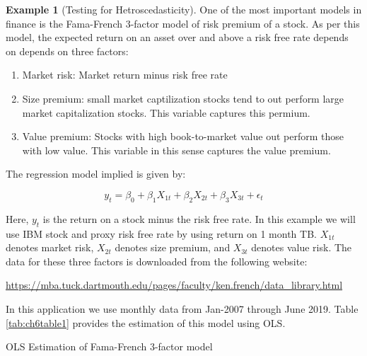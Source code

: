 \documentclass[
]{book}
\theoremstyle{definition}
\theoremstyle{definition}
\newtheorem{example}{Example}[chapter]
\theoremstyle{definition}
\theoremstyle{definition}
\theoremstyle{remark}
\begin{document}
\begin{example}[Testing for Hetroscedasticity]
\protect\hypertarget{exm:unnamed-chunk-94}{}\label{exm:unnamed-chunk-94}One of the most important models in finance is the Fama-French 3-factor model of risk premium of a stock. As per this model, the expected return on an asset over and above a risk free rate depends on depends on three factors:

\begin{enumerate}
\def\labelenumi{\alph{enumi}.}
\item
  Market risk: Market return minus risk free rate
\item
  Size premium: small market captilization stocks tend to out perform large market capitalization stocks. This variable captures this permium.
\item
  Value premium: Stocks with high book-to-market value out perform those with low value. This variable in this sense captures the value premium.
\end{enumerate}

The regression model implied is given by:

\[y_t= \beta_0 + \beta_1 X_{1t} + \beta_2X_{2t} + \beta_3 X_{3t} + \epsilon_t\]

Here, \(y_t\) is the return on a stock minus the risk free rate. In this example we will use IBM stock and proxy risk free rate by using return on 1 month TB. \(X_{1t}\) denotes market risk, \(X_{2t}\) denotes size premium, and \(X_{3t}\) denotes value risk. The data for these three factors is downloaded from the following website:

\url{https://mba.tuck.dartmouth.edu/pages/faculty/ken.french/data_library.html}

In this application we use monthly data from Jan-2007 through June 2019. Table \ref{tab:ch6table1} provides the estimation of this model using OLS.
\end{example}

\label{tab:ch6table1} OLS Estimation of Fama-French 3-factor model
\end{document}
